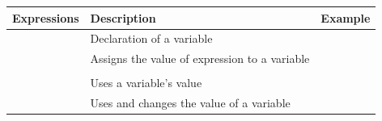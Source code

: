\begin{table}[h]
  \centering
\begin{tabular}{| p{5cm} | p{4cm} | l |} \hline
  \hfil Expressions & \hfil Description & \hfil Example \\[1ex] \hline
  \ct{| $\langle$variable name$\rangle$ |} & Declaration of a variable & \ct{| \caro height |}\\ \hline
  \ct{$\langle$length$\rangle$ := $\langle$ \emph{expression} $\rangle$} & Assigns the  value of expression to a variable & \ct{length\ :=\ 40}\\
  && \ct{length := 30 + 20}\\ \hline
  &Uses a variable's value& \ct{\caro go: length}\\ \hline

  &Uses and changes the value of a variable& \ct{length := length + 10}\\
  \hline
\end{tabular}
\end{table}


\ifx\wholebook\relax\else\fi
